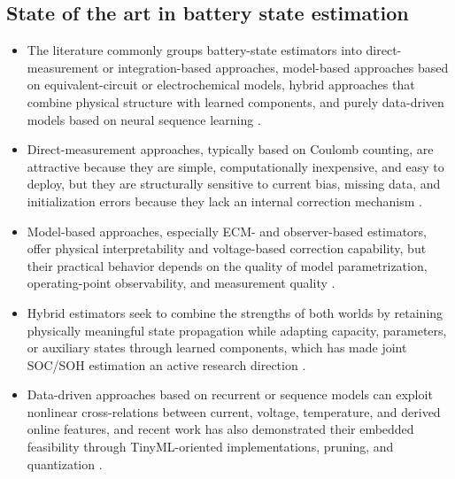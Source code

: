 \documentclass[review,nopreprintline]{elsarticle}
\begin{document}
\subsection{State of the art in battery state estimation}
\begin{itemize}[leftmargin=*]
    \item The literature commonly groups battery-state estimators into direct-measurement or integration-based approaches, model-based approaches based on equivalent-circuit or electrochemical models, hybrid approaches that combine physical structure with learned components, and purely data-driven models based on neural sequence learning \cite{khanComparativeStudyDifferent2022,shrivastavaReviewTechnologicalAdvancement2023,guoSystematicReviewElectrochemical2024,yaoSmarterBatteryManagement2025b}.
    \item Direct-measurement approaches, typically based on Coulomb counting, are attractive because they are simple, computationally inexpensive, and easy to deploy, but they are structurally sensitive to current bias, missing data, and initialization errors because they lack an internal correction mechanism \cite{khanComparativeStudyDifferent2022,liRobustnessSOCEstimation2015}.
    \item Model-based approaches, especially ECM- and observer-based estimators, offer physical interpretability and voltage-based correction capability, but their practical behavior depends on the quality of model parametrization, operating-point observability, and measurement quality \cite{gaoEnhancedStateofchargeEstimation2022,guoSystematicReviewElectrochemical2024,liRobustnessSOCEstimation2015}.
    \item Hybrid estimators seek to combine the strengths of both worlds by retaining physically meaningful state propagation while adapting capacity, parameters, or auxiliary states through learned components, which has made joint SOC/SOH estimation an active research direction \cite{gaoCoEstimationStateofChargeStateof2022,shenAlternativeCombinedCoestimation2022,wangFusionEstimationLithiumion2022}.
    \item Data-driven approaches based on recurrent or sequence models can exploit nonlinear cross-relations between current, voltage, temperature, and derived online features, and recent work has also demonstrated their embedded feasibility through TinyML-oriented implementations, pruning, and quantization \cite{mondalEstimatingStateofChargeLithiumIon2024,Embedded_AI_only_SOC_mobile,giazitzisCaseStudyTiny2024,mazziStateChargeEstimation2022,yaoSmarterBatteryManagement2025b}.
\end{itemize}
\end{document}
